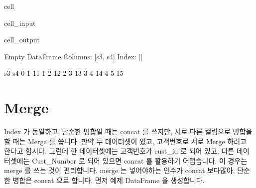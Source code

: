 \documentclass[letterpaper,10pt,english]{jupyterBook}
\begin{document}
\begin{sphinxuseclass}{cell}
\begin{sphinxVerbatimInput}
\begin{sphinxuseclass}{cell_input}
\end{sphinxuseclass}\end{sphinxVerbatimInput}
\begin{sphinxVerbatimOutput}

\begin{sphinxuseclass}{cell_output}
\begin{sphinxVerbatim}[commandchars=\\\{\}]
Empty DataFrame
Columns: [s3, s4]
Index: []


   s3  s4
0   1  11
1   2  12
2   3  13
3   4  14
4   5  15
\end{sphinxVerbatim}

\end{sphinxuseclass}\end{sphinxVerbatimOutput}

\end{sphinxuseclass}

\part{Merge}
\label{\detokenize{chapter2/2.2.2_Useful_Techniques:merge}}
\sphinxAtStartPar
Index 가 동일하고, 단순한 병합일 때는 concat 를 쓰지만, 서로 다른 컬럼으로 병합을 할 때는 Merge 를 씁니다.
만약 두 데이터셋이 있고, 고객번호로 서로 Merge 하려고 한다고 합시다. 그런데 한 데이터셋에는 고객번호가 cust\_id 로 되어 있고, 다른 데이터셋에는 Cust\_Number 로 되어 있으면 concat 를 활용하기 어렵습니다. 이 경우는 merge 를 쓰는 것이 편리합니다. merge 는 넣어야하는 인수가 concat 보다많아, 단순한 병합은 concat 으로 합니다. 먼저 예제 DataFrame 을 생성합니다.
\end{document}
